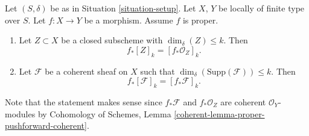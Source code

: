 \begin{lemma}
\label{lemma-cycle-push-sheaf}
Let $(S, \delta)$ be as in Situation \ref{situation-setup}.
Let $X$, $Y$ be locally of finite type over $S$.
Let $f : X \to Y$ be a morphism.
Assume $f$ is proper.
\begin{enumerate}
\item Let $Z \subset X$ be a closed subscheme with $\dim_\delta(Z) \leq k$.
Then
$$
f_*[Z]_k = [f_*{\mathcal O}_Z]_k.
$$
\item Let $\mathcal{F}$ be a coherent sheaf on $X$ such that
$\dim_\delta(\text{Supp}(\mathcal{F})) \leq k$. Then
$$
f_*[\mathcal{F}]_k = [f_*{\mathcal F}]_k.
$$
\end{enumerate}
Note that the statement makes sense since $f_*\mathcal{F}$ and
$f_*\mathcal{O}_Z$ are coherent $\mathcal{O}_Y$-modules by
Cohomology of Schemes, Lemma \ref{coherent-lemma-proper-pushforward-coherent}.
\end{lemma}

